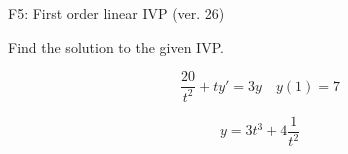 \begin{exercise}
  \begin{exerciseTitle}F5: First order linear IVP (ver. 26)\end{exerciseTitle}
  \begin{exerciseStatement}
    
Find the solution to the given IVP.

    
\[\frac{20}{t^{2}} +ty'= 3 y \hspace{1em} y( 1 ) = 7\]

  \end{exerciseStatement}
  \begin{exerciseAnswer}
    
\[y= 3 t^ 3 +4 \frac{1}{t^{2}}\]

  \end{exerciseAnswer}
\end{exercise}